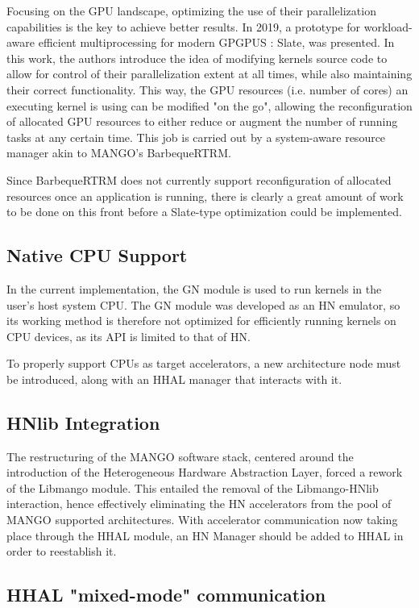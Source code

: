Focusing on the GPU landscape, optimizing the use of their parallelization capabilities is the key to achieve better results. In 2019, a prototype for workload-aware efficient multiprocessing for modern GPGPUS \cite{slate}: Slate, was presented.
In this work, the authors introduce the idea of modifying kernels source code to allow for control of their parallelization extent at all times, while also maintaining their correct functionality. This way, the GPU resources (i.e. number of cores) an executing kernel is using can be modified "on the go", allowing the reconfiguration of allocated GPU resources to either reduce or augment the number of running tasks at any certain time. This job is carried out by a system-aware resource manager akin to MANGO's BarbequeRTRM.

Since BarbequeRTRM does not currently support reconfiguration of allocated resources once an application is running, there is clearly a great amount of work to be done on this front before a Slate-type optimization could be implemented.

\subsection{Native CPU Support}

In the current implementation, the GN module is used to run kernels in the user's host system CPU. The GN module was developed as an HN emulator, so its working method is therefore not optimized for efficiently running kernels on CPU devices, as its API is limited to that of HN.

To properly support CPUs as target accelerators, a new architecture node must be introduced, along with an HHAL manager that interacts with it.

\subsection{HNlib Integration}

The restructuring of the MANGO software stack, centered around the introduction of the Heterogeneous Hardware Abstraction Layer, forced a rework of the Libmango module. This entailed the removal of the Libmango-HNlib interaction, hence effectively eliminating the HN accelerators from the pool of MANGO supported architectures.
With accelerator communication now taking place through the HHAL module, an HN Manager should be added to HHAL in order to reestablish it.

\subsection{HHAL "mixed-mode" communication} \label{sub-sect:hhal-mixed-mode}

